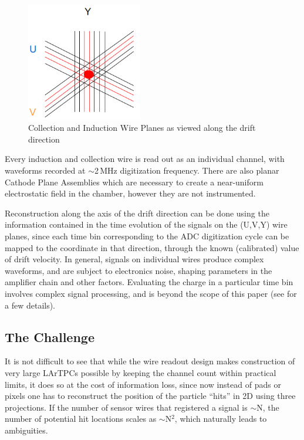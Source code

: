 \documentclass[a4paper]{jpconf}
\begin{document}
\begin{figure}[h!]
	\centering
	\includegraphics[width=0.45\textwidth]{uvy_3.png}
	\caption{Collection and Induction Wire Planes as viewed along the drift direction}
	\label{fig:wireplanes1}
\end{figure}

\noindent Every induction and collection wire is read out as an individual channel, with waveforms recorded at $\sim$2\,MHz digitization frequency.
There are also planar Cathode Plane Assemblies which are necessary to create a near-uniform electrostatic field in
the chamber, however they are not instrumented.

Reconstruction along the axis of the drift direction
can be done using the information contained in the time evolution of the signals on the (U,V,Y) wire planes, since each time bin corresponding to the
ADC digitization cycle can be mapped to the coordinate in that direction, through the known (calibrated) value of drift velocity.
In general, signals on individual wires produce complex waveforms, and are subject to electronics noise, shaping parameters in the
amplifier chain and other factors. Evaluating the charge in a particular time bin involves complex signal processing, and
is beyond the scope of this paper (see \cite{m1016} for a few details).



\subsection{The Challenge}
\label{ambiguity}
It is not difficult to see that while the wire readout design makes construction of very large LArTPCs possible by keeping the channel count
within practical limits,
it does so at the cost of information loss, since now instead of pads or pixels one has to reconstruct the position of the
particle ``hits'' in 2D using three projections. If the number of sensor wires that
registered a signal is $\sim$N, the number of potential hit locations scales as $\sim$N$^2$, which naturally leads to ambiguities.
\end{document}
